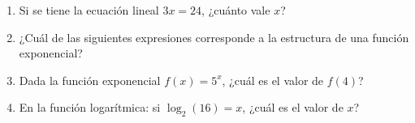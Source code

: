 \documentclass[10pt,a4paper]{article}
\begin{document}
\begin{enumerate}[label=\textbf{\arabic*.}]
\begin{enumerate}[label=\textbf{\Alph*)}]
\end{enumerate}
\vspace{0.15cm}
\item Si se tiene la ecuación lineal \(3x = 24\), ¿cuánto vale \(x\)?
\begin{enumerate}[label=\textbf{\Alph*)}]
\end{enumerate}
\vspace{0.15cm}
\item ¿Cuál de las siguientes expresiones corresponde a la estructura de una función exponencial?
\begin{enumerate}[label=\textbf{\Alph*)}]
\end{enumerate}
\vspace{0.15cm}
\item Dada la función exponencial \(f(x) = 5^x\), ¿cuál es el valor de \(f(4)\)?
\begin{enumerate}[label=\textbf{\Alph*)}]
\end{enumerate}
\vspace{0.15cm}
\item En la función logarítmica: si \(\log_2(16) = x\), ¿cuál es el valor de \(x\)?
\begin{enumerate}[label=\textbf{\Alph*)}]

\end{enumerate}
\end{enumerate}
\end{document}
